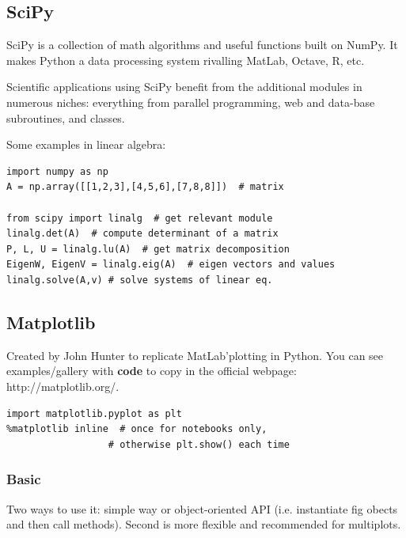 \documentclass[12pt]{article}
\begin{document}
\subsection{SciPy}
SciPy is a collection of math algorithms and useful functions built on NumPy. It makes Python a data processing system rivalling MatLab, Octave, R, etc.

Scientific applications using SciPy benefit from the additional modules in numerous niches: everything from parallel programming, web and data-base subroutines, and classes.

Some examples in linear algebra:
\begin{lstlisting}
import numpy as np
A = np.array([[1,2,3],[4,5,6],[7,8,8]])  # matrix

from scipy import linalg  # get relevant module
linalg.det(A)  # compute determinant of a matrix
P, L, U = linalg.lu(A)  # get matrix decomposition
EigenW, EigenV = linalg.eig(A)  # eigen vectors and values
linalg.solve(A,v) # solve systems of linear eq.
\end{lstlisting}


\subsection{Matplotlib}
Created by John Hunter to replicate MatLab'plotting in Python. You can see examples/gallery with \textbf{code} to copy in the official webpage: http://matplotlib.org/.
\begin{lstlisting}
import matplotlib.pyplot as plt
%matplotlib inline  # once for notebooks only, 
                  # otherwise plt.show() each time
\end{lstlisting}

\subsubsection{Basic}
Two ways to use it: simple way or object-oriented API (i.e. instantiate fig obects and then call methods). Second is more flexible and recommended for multiplots.
\end{document}
